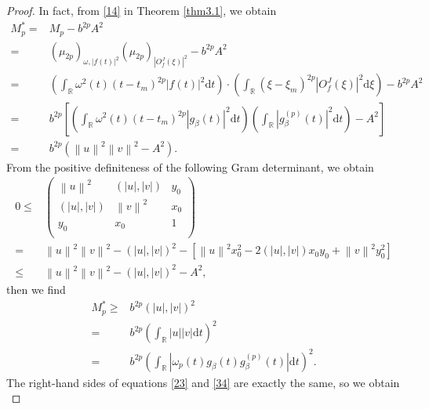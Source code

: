 \documentclass[preprint,12pt]{elsarticle}
\begin{document}
\begin{proof}
	In fact, from \eqref{14} in Theorem \ref{thm3.1}, we obtain
	\begin{align}
	\label{32}
	M_p^* =& M_p -b^{2p} A^2 \nonumber\\
	=&(\mu_{2p})_{\omega,\left|f(t) \right|^2}(\mu_{2p})_{\left| O_f^J(\xi) \right|^2} - b^{2p} A^2 \nonumber\\
	=&\left( \int_{\mathbb{R}} \omega^2(t) (t-t_m)^{2p} \left|f(t) \right|^2 \mathrm{d}t \right) \cdot \left( \int_{\mathbb{R}} (\xi-\xi_m)^{2p} \left|O_f^J(\xi) \right|^2 \mathrm{d}\xi \right) -b^{2p} A^2 \nonumber\\
	=&b^{2p} \left[ \left( \int_{\mathbb{R}} \omega^2(t) (t-t_m)^{2p} \left| g_{\beta}(t) \right|^2 \mathrm{d}t \right) \left( \int_{\mathbb{R}} \left| g_{\beta}^{(p)} (t) \right| ^2 \mathrm{d}t \right) -A^2 \right]  \nonumber\\
	=&b^{2p} \left( \left\|u\right\|^2 \left\|v\right\|^2 -A^2 \right).
	\end{align} 
	From the positive definiteness of the following Gram determinant, we obtain
	\begin{align*}
	0 \leq &\begin{pmatrix}
	\left\|u\right\|^2&(\left|u\right|,\left|v\right|)&y_0\\
	(\left|u\right|,\left|v\right|)&\left\|v\right\|^2&x_0\\
	y_0&x_0&1\\
	\end{pmatrix} \nonumber \\
	=&\left\|u\right\|^2 \left\|v\right\|^2-(\left|u\right|,\left|v\right|)^2-\left[\left\|u\right\|^2 x_0^2 -2(\left|u\right|,\left|v\right|)x_0y_0+\left\|v\right\|^2y_0^2 \right] \nonumber \\
	\leq &\left\|u\right\|^2 \left\|v\right\|^2-(\left|u\right|,\left|v\right|)^2-A^2,
	\end{align*}
	then we find
	\begin{align}
	\label{34}
	M_p^* \ge& b^{2p}(\left|u \right|,\left|v \right|)^2 \nonumber \\
	=&b^{2p} \left( \int_{\mathbb{R}} \left|u \right| \left|v \right| \mathrm{d}t \right)^2  \nonumber\\
	=&b^{2p}  \left( \int_{\mathbb{R}} \left|\omega_p(t) g_{\beta}(t) g_{\beta}^{(p)} (t) \right| \mathrm{d}t \right)^2.
	\end{align}
	The right-hand sides of equations \eqref{23} and \eqref{34} are exactly the same, so we obtain
	\begin{equation}

\end{equation}
\end{proof}
\end{document}
